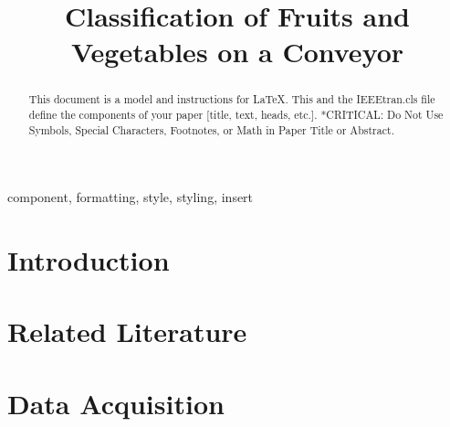 \documentclass[conference]{IEEEtran}
\begin{document}
	
	\title{Classification of Fruits and Vegetables on a Conveyor}
		\author{
		\and
		\and
	}
	
	\maketitle
	
	\begin{abstract}
		This document is a model and instructions for \LaTeX.
		This and the IEEEtran.cls file define the components of your paper [title, text, heads, etc.]. *CRITICAL: Do Not Use Symbols, Special Characters, Footnotes, 
		or Math in Paper Title or Abstract.
	\end{abstract}
	
	\begin{IEEEkeywords}
		component, formatting, style, styling, insert
	\end{IEEEkeywords}
	
	\section{Introduction}
	
	
	\section{Related Literature}
	
	
	\section{Data Acquisition}
	
	
\end{document}
